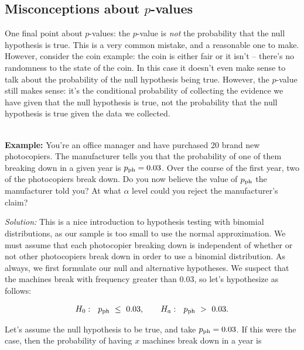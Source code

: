 \subsection{Misconceptions about $p$-values}



One final point about $p$-values: the $p$-value is \emph{not }the probability that the null hypothesis is true. This is a very common mistake, and a reasonable one to make. However, consider the coin example: the coin is either fair or it isn't -- there's no randomness to the state of the coin.  In this case it doesn't even make sense to talk about the probability of the null hypothesis being true. However, the $p$-value still makes sense: it's the conditional probability of collecting the evidence we have given that the null hypothesis is true, not the probability that the null hypothesis is true given the data we collected.



\ \\



\textbf{Example:} \ex You're an office manager and have purchased 20 brand new photocopiers.  The manufacturer tells you that the probability of one of them breaking down in a given year is $p_{\rm ph}=0.03$.  Over the course of the first year, two of the photocopiers break down.  Do you now believe the value of $p_{\rm ph}$ the manufacturer told you?  At what $\alpha$ level could you reject the manufacturer's claim?



\emph{Solution:} This is a nice introduction to hypothesis testing with binomial distributions, as our sample is too small to use the normal approximation. We must assume that each photocopier breaking down is independent of whether or not other photocopiers break down in order to use a binomial distribution. As always, we first formulate our null and alternative hypotheses. We suspect that the machines break with frequency greater than 0.03, so let's hypothesize as follows:

\begin{eqnarray}

H_0:\ \ p_{\rm ph}\  \leq\ 0.03,\ \ \ \ \ \ H_a:\  \ p_{\rm ph}\ >\ 0.03.

\end{eqnarray}

Let's assume the null hypothesis to be true, and take $p_{\rm ph} = 0.03$.  If this were the case, then the probability of having $x$ machines break down in a year is

